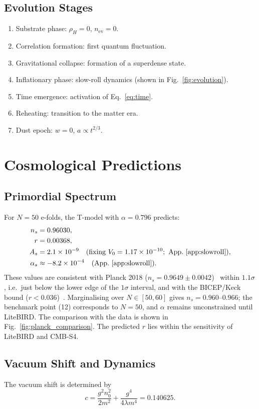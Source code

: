 \documentclass[11pt,a4paper]{article}
\begin{document}
\subsection{Evolution Stages}
\begin{enumerate}
\item Substrate phase: $\rho_{H}=0$, $n_{\mathrm{ev}}=0$.
\item Correlation formation: first quantum fluctuation.
\item Gravitational collapse: formation of a superdense state.
\item Inflationary phase: slow-roll dynamics (shown in
      Fig.~\ref{fig:evolution}).
\item Time emergence: activation of Eq.~\eqref{eq:time}.
\item Reheating: transition to the matter era.
\item Dust epoch: $w=0$, $a\propto t^{2/3}$.
\end{enumerate}

\section{Cosmological Predictions}
\subsection{Primordial Spectrum}
For $N=50$ e-folds, the T-model with $\alpha=0.796$ predicts:
\begin{align}
n_{s}&=0.96030,\label{eq:ns}\\
r&=0.00368,\label{eq:r}\\
A_{s}&=2.1\times10^{-9}\quad
\text{(fixing } V_{0}=1.17\times10^{-10};
\text{ App.~\ref{app:slowroll})},\label{eq:As}\\
\alpha_{s}&\approx-8.2\times10^{-4}
\quad(\text{App.~\ref{app:slowroll}}).\label{eq:alphas}
\end{align}
These values are consistent with Planck 2018
($n_{s}=0.9649\pm0.0042$)~\cite{Planck2018} within $1.1\sigma$,
i.e.\ just below the lower edge of the $1\sigma$ interval, and with
the BICEP/Keck bound ($r<0.036$)~\cite{BICEPKeck}. Marginalising
over $N\in[50,60]$ gives $n_{s}=0.960$--$0.966$; the benchmark
point (12) corresponds to $N=50$, and $\alpha$ remains
unconstrained until LiteBIRD. The comparison with the data is shown
in Fig.~\ref{fig:planck_comparison}. The predicted $r$ lies within
the sensitivity of LiteBIRD and CMB-S4.

\subsection{Vacuum Shift and Dynamics}
The vacuum shift is determined by
\begin{equation}
c=\frac{g^{2}n_{0}^{2}}{2m^{2}}
 +\frac{g^{4}}{4\lambda m^{4}}=0.140625.
\label{eq:vacuum}
\end{equation}
\end{document}
